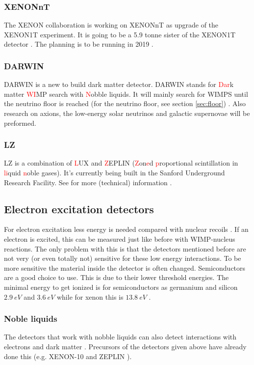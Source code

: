 \documentclass{article}
\begin{document}
\subsubsection{XENONnT}
The XENON collaboration is working on XENONnT as upgrade of the XENON1T experiment. It is going to be a 5.9 tonne sister of the XENON1T detector \cite{Aprile:2018dbl}. The planning is to be running in 2019 \cite{APPEC}.


\subsubsection{DARWIN}
DARWIN is a new to build dark matter detector. DARWIN stands for \textcolor{red}{Dar}k matter \textcolor{red}{WI}MP search with \textcolor{red}{N}obble liquids. It will mainly search for WIMPS until the neutrino floor is reached (for the neutrino floor, see section \ref{sec:floor}) \cite{Aalbers:2016jon}. Also research on axions, the low-energy solar neutrinos and galactic supernovae will be preformed.


\subsubsection{LZ}
LZ is a combination of \textcolor{red}{L}UX and \textcolor{red}{Z}EPLIN (\textcolor{red}{Z}on\textcolor{red}{e}d \textcolor{red}{p}roportional scintillation in \textcolor{red}{li}quid \textcolor{red}{n}oble gases). It's currently being built in the Sanford Underground Research Facility. See for more (technical) information \cite{Akerib:2015cja,Mount:2017qzi}.

\subsection{Electron excitation detectors}
For electron excitation less energy is needed compared with nuclear recoils \cite{Essig:2012yx}. If an electron is excited, this can be measured just like before with WIMP-nucleus reactions. The only problem with this is that the detectors mentioned before are not very (or even totally not) sensitive for these low energy interactions. To be more sensitive the material inside the detector is often changed. Semiconductors are a good choice to use. This is due to their lower threshold energies. The minimal energy to get ionized is for semiconductors as germanium and silicon $2.9\ eV$ and $3.6\ eV$ while for xenon this is $13.8\ eV$ \cite{Essig:2018tss}.

\subsubsection{Noble liquids}
The detectors that work with nobble liquids can also detect interactions with electrons and dark matter \cite{Essig:2011nj}. Precursors of the detectors given above have already done this (e.g. XENON-10 \cite{Angle:2011th} and ZEPLIN \cite{Edwards:2007nj}).
\end{document}
